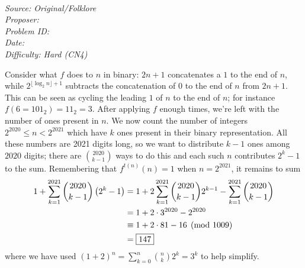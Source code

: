 \SSbreak\\
\emph{Source: Original/Folklore}\\
\emph{Proposer: \Paiya}\\ %
\emph{Problem ID:}\\
\emph{Date: }\\
\emph{Difficulty: Hard (CN4)}\\
\SSbreak

\bigskip

\begin{solution}\hfil\medskip
	
    Consider what $f$ does to $n$ in binary: $2n + 1$ concatenates a $1$ to the end of $n$, while 
    $2^{\lfloor \log_2n \rfloor + 1}$ subtracts the concatenation of $0$ to the end of $n$ from $2n + 1$. 
    This can be seen as cycling the leading $1$ of $n$ to the end of $n$; for instance $f\left(6 = 101_2\right) = 11_2 = 3$. 
    After applying $f$ enough times, we're left with the number of ones present in $n$. We now count the number of integers $2^{2020} \leq n < 2^{2021}$
    which have $k$ ones present in their binary representation. All these numbers are 2021 digits long, so we want to distribute $k - 1$ ones among $2020$ digits;
    there are $\binom{2020}{k - 1}$ ways to do this and each such $n$ contributes $2^k - 1$ to the sum. 
    Remembering that $f^{t(n)}(n) = 1$ when $n = 2^{2021}$, it remains to sum 
    \begin{align*}
        1 + \sum_{k = 1}^{2021} \dbinom{2020}{k - 1}\left(2^k - 1\right) &= 1 + 2\sum_{k = 1}^{2021} \dbinom{2020}{k - 1}2^{k - 1} - \sum_{k = 1}^{2021} \dbinom{2020}{k - 1} \\
        &= 1 + 2 \cdot 3^{2020} - 2^{2020} \\
        &\equiv 1 + 2 \cdot 81 - 16 \pmod{1009}\\
        &= \boxed{147}
    \end{align*}
    where we have used $(1 + 2)^n = \sum_{k = 0}^n \binom{n}{k} 2^k = 3^k$ to help simplify.
\end{solution}\bigskip
